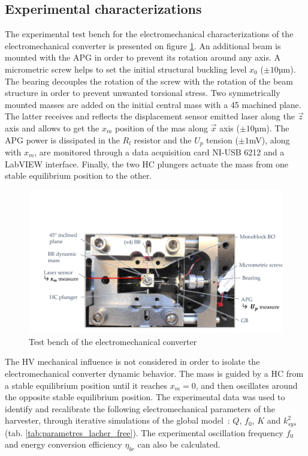 \documentclass[3p,twocolumn,preprint]{elsarticle}
\begin{document}
	\subsection{Experimental characterizations}	
	\label{subsec:Experimental characterizations}
The experimental test bench for the electromechanical characterizations of the electromechanical converter is presented on figure \ref{fig:BDT_OB+GPA}. An additional beam is mounted with the APG in order to prevent its rotation around any axis. A micrometric screw helps to set the initial structural buckling level $x_0$ ($\pm 10$µm). The bearing decouples the rotation of the screw with the rotation of the beam structure in order to prevent unwanted torsional stress. Two symmetrically mounted masses are added on the initial central mass with a 45\degree{} machined plane. The latter receives and reflects the displacement sensor emitted laser along the $\vec{z}$ axis and allows to get the $x_m$ position of the mas along $\vec{x}$ axis ($\pm 10$µm). The APG power is dissipated in the $R_l$ resistor and the $U_p$ tension ($\pm 1$mV), along with $x_m$, are monitored through a data acquisition card NI-USB 6212 and a LabVIEW interface. Finally, the two HC plungers actuate the mass from one stable equilibrium position to the other.
\begin{figure}[!htbp]
	\centering
	\captionsetup{justification=centering}
	\includegraphics[trim={2cm 0cm 0cm 5.5cm},clip,width=\linewidth]{figures/BDT_OB+GPA.pdf}
	\caption{Test bench of the electromechanical converter}
	\label{fig:BDT_OB+GPA}
\end{figure}
The HV mechanical influence is not considered in order to isolate the electromechanical converter dynamic behavior. The mass is guided by a HC from a stable equilibrium position until it reaches \mbox{$x_m=0$}, and then oscillates around the opposite stable equilibrium position. The experimental data was used to identify and recalibrate the following electromechanical parameters of the harvester, through iterative simulations of the global \mbox{model :} $Q$, $f_0$, $K$ and $k_{sys}^2$ (tab. \ref{tab:parametres_lacher_free}). The experimental oscillation frequency $f_0$ and energy conversion efficiency $\eta_{br}$ can also be calculated.
\end{document}

